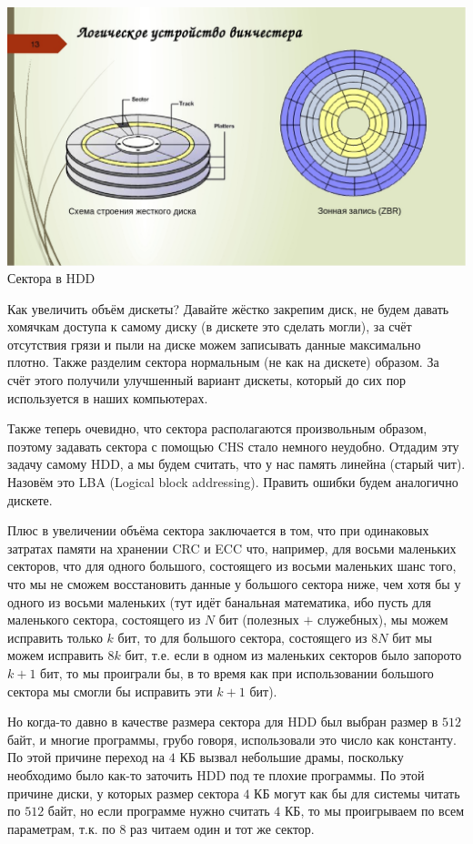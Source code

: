 \documentclass[12pt, a4paper]{article}
\begin{document}
\begin{center}
{\includegraphics[scale=0.3]{./images/SectorsInHDD.jpg} \\ Сектора в HDD}
\end{center}

Как увеличить объём дискеты? Давайте жёстко закрепим диск, не будем давать хомячкам доступа к самому диску (в дискете это сделать могли), за счёт отсутствия грязи и пыли на диске можем записывать данные максимально плотно. Также разделим сектора нормальным (не как на дискете) образом. За счёт этого получили улучшенный вариант дискеты, который до сих пор используется в наших компьютерах.

Также теперь очевидно, что сектора располагаются произвольным образом, поэтому задавать сектора с помощью CHS стало немного неудобно. Отдадим эту задачу самому HDD, а мы будем считать, что у нас память линейна (старый чит). Назовём это LBA (Logical block addressing). Править ошибки будем аналогично дискете. 

Плюс в увеличении объёма сектора заключается в том, что при одинаковых затратах памяти на хранении CRC и ECC что, например, для восьми маленьких секторов, что для одного большого, состоящего из восьми маленьких шанс того, что мы не сможем восстановить данные у большого сектора ниже, чем хотя бы у одного из восьми маленьких (тут идёт банальная математика, ибо пусть для маленького сектора, состоящего из $N$ бит (полезных $+$ служебных), мы можем исправить только $k$ бит, то для большого сектора, состоящего из $8N$ бит мы можем исправить $8k$ бит, т.е. если в одном из маленьких секторов было запорото $k+1$ бит, то мы проиграли бы, в то время как при использовании большого сектора мы смогли бы исправить эти $k+1$ бит).

Но когда-то давно в качестве размера сектора для HDD был выбран размер в $512$ байт, и многие программы, грубо говоря, использовали это число как константу. По этой причине переход на $4$ КБ вызвал небольшие драмы, поскольку необходимо было как-то заточить HDD под те плохие программы. По этой причине диски, у которых размер сектора $4$ КБ могут как бы для системы читать по $512$ байт, но если программе нужно считать $4$ КБ, то мы проигрываем по всем параметрам, т.к. по $8$ раз читаем один и тот же сектор. 
\end{document}
